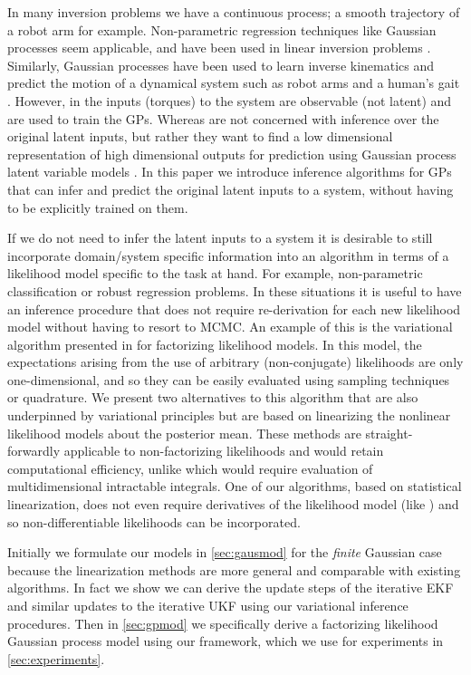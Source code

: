 \documentclass{article} %
\begin{document}
In many inversion problems we have a continuous process; a smooth trajectory of
a robot arm for example. Non-parametric regression techniques like Gaussian
processes \cite{Rasmussen2006} seem applicable, and have been used in linear
inversion problems \cite{Reid2013}. Similarly, Gaussian processes have been
used to learn inverse kinematics and predict the motion of a dynamical system
such as robot arms \cite{Rasmussen2006, Williams2008} and a human's gait
\cite{Lawrence2003, Wang2005, Wang2008}.  However, in \cite{Rasmussen2006,
    Williams2008} the inputs (torques) to the system are observable (not
latent) and are used to train the GPs. Whereas \cite{Wang2005, Wang2008} are
not concerned with inference over the original latent inputs, but rather they
want to find a low dimensional representation of high dimensional outputs for
prediction using Gaussian process latent variable models \cite{Lawrence2003}.
In this paper we introduce inference algorithms for GPs that can infer and
predict the original latent inputs to a system, without having to be explicitly
trained on them.

If we do not need to infer the latent inputs to a system it is desirable to
still incorporate domain/system specific information into an algorithm in terms
of a likelihood model specific to the task at hand. For example, non-parametric
classification or robust regression problems. In these situations it is useful
to have an inference procedure that does not require re-derivation for each new
likelihood model without having to resort to MCMC. An example of this is the
variational algorithm presented in \cite{Opper2009} for factorizing likelihood
models. In this model, the expectations arising from the use of arbitrary
(non-conjugate) likelihoods are only one-dimensional, and so they can be easily
evaluated using sampling techniques or quadrature. 
%
We present two alternatives to this algorithm that are also underpinned by
variational principles but are based on linearizing the nonlinear likelihood
models about the posterior mean. These methods are straight-forwardly
applicable to non-factorizing likelihoods and would retain computational
efficiency, unlike \cite{Opper2009} which would require evaluation of
multidimensional intractable integrals. One of our algorithms, based on
statistical linearization, does not even require derivatives of the likelihood
model (like \cite{Opper2009}) and so non-differentiable likelihoods can be
incorporated.

Initially we formulate our models in \autoref{sec:gausmod} for the
\emph{finite} Gaussian case because the linearization methods are more general
and comparable with existing algorithms. In fact we show we can derive the
update steps of the iterative EKF \cite{Bell1993} and similar updates to the
iterative UKF \cite{Sibley2006} using our variational inference procedures.
Then in \autoref{sec:gpmod} we specifically derive a factorizing likelihood
Gaussian process model using our framework, which we use for experiments in
\autoref{sec:experiments}.
\end{document}
